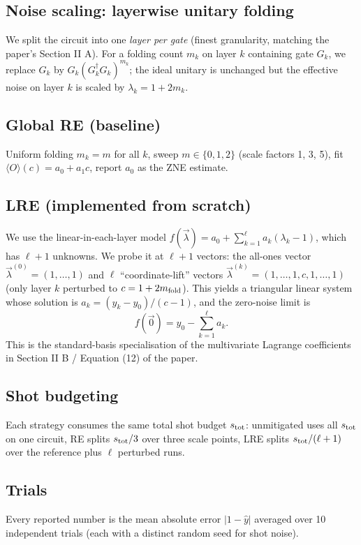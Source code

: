 \documentclass[11pt]{article}
\begin{document}
\subsection{Noise scaling: layerwise unitary folding}
We split the circuit into one \emph{layer per gate} (finest granularity, matching the
paper's Section II A). For a folding count $m_k$ on layer $k$ containing gate $G_k$,
we replace $G_k$ by $G_k (G_k^\dagger G_k)^{m_k}$; the ideal unitary is unchanged but the
effective noise on layer $k$ is scaled by $\lambda_k = 1 + 2 m_k$.

\subsection{Global RE (baseline)}
Uniform folding $m_k = m$ for all $k$, sweep $m \in \{0,1,2\}$ (scale factors 1, 3, 5),
fit $\langle O\rangle(c) = a_0 + a_1 c$, report $a_0$ as the ZNE estimate.

\subsection{LRE (implemented from scratch)}
We use the linear-in-each-layer model
$f(\vec\lambda) = a_0 + \sum_{k=1}^\ell a_k (\lambda_k - 1)$,
which has $\ell+1$ unknowns. We probe it at $\ell+1$ vectors: the all-ones vector
$\vec\lambda^{(0)} = (1,\ldots,1)$ and $\ell$ ``coordinate-lift'' vectors
$\vec\lambda^{(k)} = (1,\ldots,1,c,1,\ldots,1)$ (only layer $k$ perturbed to $c=1+2m_{\rm fold}$).
This yields a triangular linear system whose solution is
$a_k = (y_k - y_0)/(c-1)$, and the zero-noise limit is
$$f(\vec 0) = y_0 - \sum_{k=1}^\ell a_k. $$
This is the standard-basis specialisation of the multivariate Lagrange
coefficients in Section II B / Equation (12) of the paper.

\subsection{Shot budgeting}
Each strategy consumes the same total shot budget $s_{\rm tot}$:
unmitigated uses all $s_{\rm tot}$ on one circuit, RE splits $s_{\rm tot}/3$ over three
scale points, LRE splits $s_{\rm tot}/(\ell+1)$ over the reference plus $\ell$ perturbed runs.

\subsection{Trials}
Every reported number is the mean absolute error $|1 - \hat{y}|$ averaged over 10
independent trials (each with a distinct random seed for shot noise).
\end{document}
